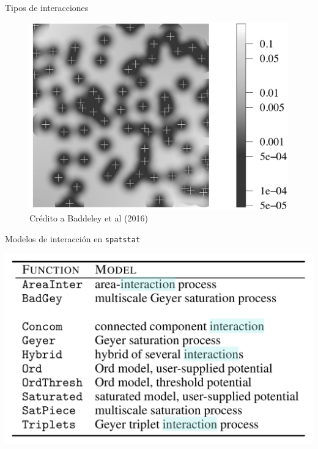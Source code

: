 \documentclass[
  11pt,
  ignorenonframetext,
]{beamer}
\begin{document}
\begin{frame}{Tipos de interacciones}
\protect\hypertarget{tipos-de-interacciones}{}
\begin{figure}

{\centering \includegraphics[width=15.29in]{Figuras/Tipos-interacciones} 

}

\caption{Crédito a Baddeley et al (2016)}\label{fig:unnamed-chunk-25}
\end{figure}
\end{frame}

\begin{frame}{Modelos de interacción en \texttt{spatstat}}
\protect\hypertarget{modelos-de-interacciuxf3n-en-spatstat}{}
\begin{center}\includegraphics[width=17.28in]{Figuras/Tabla-tipos-interacciones} \end{center}
\end{frame}
\end{document}
